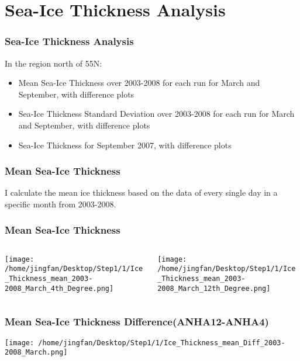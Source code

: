 \documentclass{beamer}
\begin{document}
\section{Sea-Ice Thickness Analysis}
\begin{frame}
\frametitle{Sea-Ice Thickness Analysis}

In the region north of 55N: 

\begin{itemize}

\item Mean Sea-Ice Thickness over 2003-2008 for each run for March and September, with difference plots
\item Sea-Ice Thickness Standard Deviation over 2003-2008 for each run for March and September, with difference plots
\item Sea-Ice Thickness for September 2007, with difference plots

\end{itemize}

\end{frame}

\begin{frame}
\frametitle{Mean Sea-Ice Thickness}
I calculate the mean ice thickness based on the data of every single day in a specific month from 2003-2008. 
\end{frame}

\begin{frame}
\frametitle{Mean Sea-Ice Thickness}

\begin{columns}
\begin{column}[t]{0.5\linewidth}
\centering
\texttt{[image: /home/jingfan/Desktop/Step1/1/Ice\_Thickness\_mean\_2003-2008\_March\_4th\_Degree.png]}
\end{column}
\begin{column}[t]{0.5\linewidth}
\centering
\texttt{[image: /home/jingfan/Desktop/Step1/1/Ice\_Thickness\_mean\_2003-2008\_March\_12th\_Degree.png]}
\end{column}
\end{columns}

\end{frame}

\begin{frame}
\frametitle{Mean Sea-Ice Thickness Difference(ANHA12-ANHA4)}

\texttt{[image: /home/jingfan/Desktop/Step1/1/Ice\_Thickness\_mean\_Diff\_2003-2008\_March.png]}

\end{frame}
\end{document}
